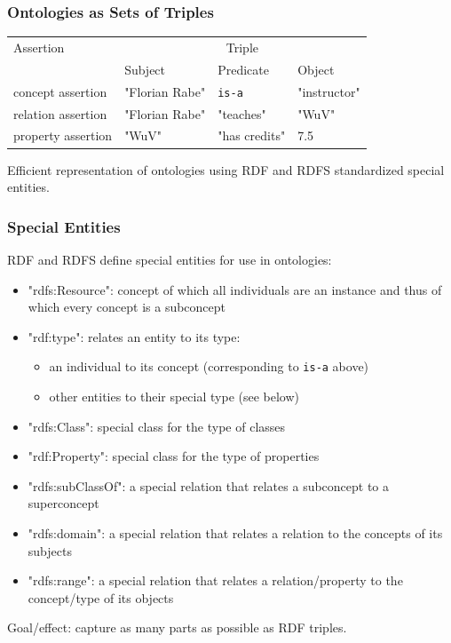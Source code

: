 \begin{frame}\frametitle{Ontologies as Sets of Triples}
\begin{center}
\begin{tabular}{l|lll}
Assertion & \multicolumn{3}{c}{Triple} \\
          & Subject & Predicate & Object \\
\hline
concept assertion  & "Florian Rabe" & \texttt{is-a} & "instructor" \\
relation assertion & "Florian Rabe" & "teaches" & "WuV" \\
property assertion & "WuV" & "has credits" & 7.5 \\
\end{tabular}
\medskip

Efficient representation of ontologies using RDF and RDFS standardized special entities.
\end{center}
\end{frame}

\begin{frame}\frametitle{Special Entities}
RDF and RDFS define special entities for use in ontologies:
\begin{itemize}
 \item "rdfs:Resource": concept of which all individuals are an instance and thus of which every concept is a subconcept
 \item "rdf:type": relates an entity to its type:
  \begin{itemize}
   \item an individual to its concept (corresponding to \texttt{is-a} above)
   \item other entities to their special type (see below)
  \end{itemize}
 \item "rdfs:Class": special class for the type of classes
 \item "rdf:Property": special class for the type of properties
 \item "rdfs:subClassOf": a special relation that relates a subconcept to a superconcept
 \item "rdfs:domain": a special relation that relates a relation to the concepts of its subjects
 \item "rdfs:range": a special relation that relates a relation/property to the concept/type of its objects
\end{itemize}

Goal/effect: capture as many parts as possible as RDF triples.
\end{frame}

